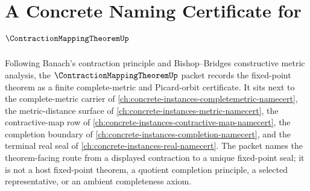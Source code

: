 \chapter{A Concrete Naming Certificate for $\ContractionMappingTheoremUp$}
\label{ch:concrete-instances-contraction-mapping-theorem-namecert}

Following Banach's contraction principle and Bishop--Bridges constructive metric analysis, the $\ContractionMappingTheoremUp$ packet records the fixed-point theorem as a finite complete-metric and Picard-orbit certificate. It sits next to the complete-metric carrier of \autoref{ch:concrete-instances-completemetric-namecert}, the metric-distance surface of \autoref{ch:concrete-instances-metric-namecert}, the contractive-map row of \autoref{ch:concrete-instances-contractive-map-namecert}, the completion boundary of \autoref{ch:concrete-instances-completion-namecert}, and the terminal real seal of \autoref{ch:concrete-instances-real-namecert}. The packet names the theorem-facing route from a displayed contraction to a unique fixed-point seal; it is not a host fixed-point theorem, a quotient completion principle, a selected representative, or an ambient completeness axiom.

